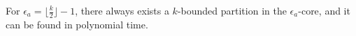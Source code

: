 \documentclass[sigconf]{aamas}
\begin{document}
\begin{theorem}
For $\epsilon_a = \lfloor \frac{k}{2} \rfloor -1$, there always exists a $k$-bounded partition in the $\epsilon_a$-core, and it can be found in polynomial time.
\end{theorem}



\end{document}
